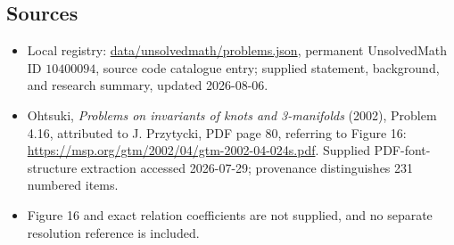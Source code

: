 \documentclass[11pt]{article}
\begin{document}
\subsection{Sources}
\begin{itemize}
\item Local registry: \url{data/unsolvedmath/problems.json}, permanent UnsolvedMath ID \(10400094\), source code catalogue entry; supplied statement, background, and research summary, updated 2026-08-06.
\item Ohtsuki, \emph{Problems on invariants of knots and 3-manifolds} (2002), Problem 4.16, attributed to J. Przytycki, PDF page 80, referring to Figure 16: \url{https://msp.org/gtm/2002/04/gtm-2002-04-024s.pdf}. Supplied PDF-font-structure extraction accessed 2026-07-29; provenance distinguishes 231 numbered items.
\item Figure 16 and exact relation coefficients are not supplied, and no separate resolution reference is included.
\end{itemize}
\end{document}
